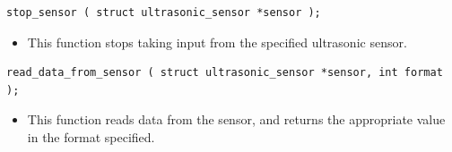 \documentclass[12pt]{article}
\begin{document}
\begin{verbatim}
stop_sensor ( struct ultrasonic_sensor *sensor );\end{verbatim}
\begin{itemize}
\item This function stops taking input from the specified ultrasonic sensor.
\end{itemize}

\begin{verbatim}
read_data_from_sensor ( struct ultrasonic_sensor *sensor, int format );\end{verbatim}
\begin{itemize}
\item This function reads data from the sensor, and returns the appropriate value in the format specified.
\end{itemize}
\end{document}
